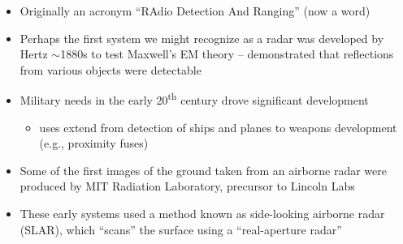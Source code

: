 \documentclass[11pt, oneside]{article}
\begin{document}
\begin{itemize}
	\item Originally an acronym ``RAdio Detection And Ranging'' (now a word)
	\item Perhaps the first system we might recognize as a radar was developed by Hertz ${\sim}$1880s to test Maxwell's EM theory -- demonstrated that reflections from various objects were detectable
	\item Military needs in the early 20\textsuperscript{th} century drove significant development
	\begin{itemize}
		\item[--] uses extend from detection of ships and planes to weapons development (e.g., proximity fuses)
	\end{itemize}
	\item Some of the first images of the ground taken from an airborne radar were produced by MIT Radiation Laboratory, precursor to Lincoln Labs
	\item These early systems used a method known as side-looking airborne radar (SLAR), which ``scans'' the surface using a ``real-aperture radar''
	\begin{itemize}

\end{itemize}
\end{itemize}
\end{document}
